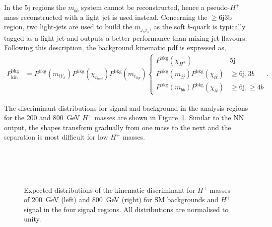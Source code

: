 In the 5j regions the $m_{b\bar{b}}$ system cannot be reconstructed, hence a pseudo-$H^+$ mass reconstructed with a light jet is used instead. Concerning the $\geq$6j3b region, two light-jets are used to build the $m_{j_hj_4}$, as the soft $b$-quark is typically tagged as a light jet and outputs a better performance than mixing jet flavours. Following this description, the background kinematic pdf is expressed as,
\begin{align}
    P_{\text{kin}}^{\text{bkg}}&=P^{\text{bkg}}(m_{W_h})P^{\text{bkg}}(\chi_{t_{had}})P^{\text{bkg}}(m_{t_{lep}})\begin{cases}P^{\text{bkg}}(\chi_{H^+}) & 5\text{j} \\ P^{\text{bkg}}(m_{jj})P^{\text{bkg}}(\chi_{t\bar{t}})&\geq6\text{j},3b\\P^{\text{bkg}}(m_{bb})P^{\text{bkg}}(\chi_{t\bar{t}})& \geq6\text{j},\geq4b\end{cases}.
\end{align}

The discriminant distributions for signal and background in the analysis regions for the 200 and 800~GeV $H^+$ masses are shown in Figure~\ref{Hplustb:Discriminantshapes}. Similar to the NN output, the shapes transform gradually from one mass to the next and the separation is most difficult for low $H^+$ masses.

\begin{figure}[htb]
    \RawFloats
    \centering
    \\
    \\
    \\
    \caption{Expected distributions of the kinematic discriminant for $H^+$ masses of 200~GeV (left)
    and 800~GeV (right) for SM backgrounds and $H^+$ signal in the four signal regions.
    All distributions are normalised to unity.
    }
    \label{Hplustb:Discriminantshapes}
\end{figure}
\clearpage